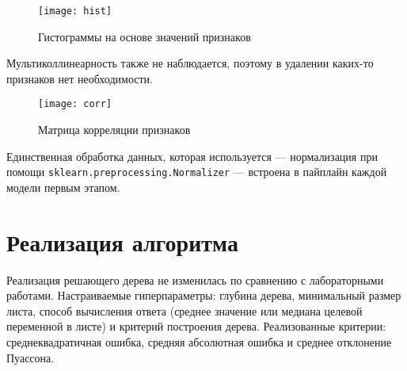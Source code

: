 \begin{figure}[h]
\centering
\texttt{[image: hist]}
\caption{Гистограммы на основе значений признаков}
\end{figure}

Мультиколлинеарность также не наблюдается, поэтому в удалении каких-то признаков нет необходимости.

\begin{figure}[h]
\centering
\texttt{[image: corr]}
\caption{Матрица корреляции признаков}
\end{figure}
\FloatBarrier

Единственная обработка данных, которая используется --- нормализация при помощи \texttt{sklearn.preprocessing.Normalizer} --- встроена в пайплайн каждой модели первым этапом.

\section{Реализация алгоритма}

Реализация решающего дерева не изменилась по сравнению с лабораторными работами. Настраиваемые гиперпараметры: глубина дерева, минимальный размер листа, способ вычисления ответа (среднее значение или медиана целевой переменной в листе) и критерий построения дерева. Реализованные критерии: среднеквадратичная ошибка, средняя абсолютная ошибка и среднее отклонение Пуассона.

